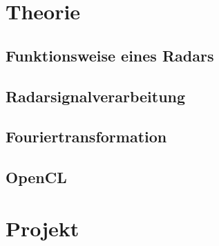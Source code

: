 \documentclass[a4paper,12pt,oneside,german,toc=bibliography]{scrbook}
\theoremstyle{definition}
\theoremstyle{plain}
\numberwithin{equation}{section}
\begin{document}


\tableofcontents


\chapter{Theorie}


\section{Funktionsweise eines Radars} 
    
    
    


\section{Radarsignalverarbeitung}
    
    
    
    


\section{Fouriertransformation}
    
    
    




\section{OpenCL}




\chapter{Projekt}

\end{document}
